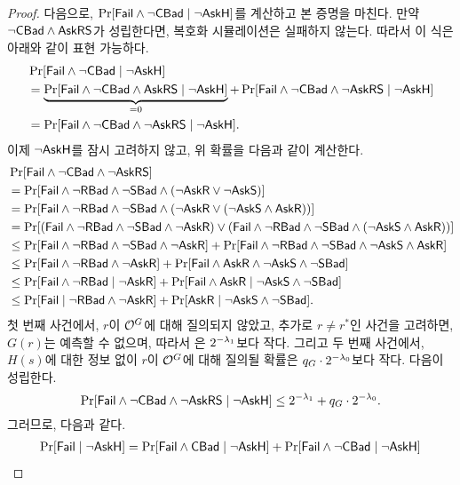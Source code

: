 \begin{proof}
	다음으로, $\Pr[\textsf{Fail} \land \neg\textsf{CBad} \mid \neg\textsf{AskH}]$를 계산하고 본 증명을
	마친다. 만약 $\neg \textsf{CBad} \wedge \textsf{AskRS}$가 성립한다면, 복호화
	시뮬레이션은 실패하지 않는다. 따라서 이 식은 아래와 같이 표현
	가능하다.
	\begin{align*}
		&\Pr[\textsf{Fail} \land \neg\textsf{CBad} \mid \neg \textsf{AskH}] \\
		&= \underbrace{\Pr[\textsf{Fail} \land \neg \textsf{CBad} \land \textsf{AskRS} \mid \neg \textsf{AskH}]}_{= 0}
		+ \Pr[\textsf{Fail} \land \neg \textsf{CBad} \land \neg \textsf{AskRS} \mid \neg \textsf{AskH}] \\
		&= \Pr[\textsf{Fail} \land \neg \textsf{CBad} \land \neg \textsf{AskRS} \mid \neg \textsf{AskH}].
	\end{align*}
	이제 $\neg \textsf{AskH}$를 잠시 고려하지 않고, 위 확률을 다음과 같이 계산한다.
	\begin{align*}
		&\Pr[\textsf{Fail} \land \neg\textsf{CBad} \land \neg\textsf{AskRS}] \\
		&= \Pr[\textsf{Fail} \land \neg\textsf{RBad} \land \neg\textsf{SBad} \land (\neg\textsf{AskR} \lor \neg\textsf{AskS})] \\
		&= \Pr[\textsf{Fail} \land \neg\textsf{RBad} \land \neg\textsf{SBad} \land (\neg\textsf{AskR} \lor (\neg\textsf{AskS} \land \textsf{AskR}))] \\
		&= \Pr[(\textsf{Fail} \land \neg\textsf{RBad} \land \neg\textsf{SBad} \land \neg\textsf{AskR}) \lor
		(\textsf{Fail} \land \neg\textsf{RBad} \land \neg\textsf{SBad} \land (\neg\textsf{AskS} \land \textsf{AskR}))] \\
		&\le \Pr[\textsf{Fail} \land \neg\textsf{RBad} \land \neg\textsf{SBad} \land \neg\textsf{AskR}]+
		\Pr[\textsf{Fail} \land \neg\textsf{RBad} \land \neg\textsf{SBad} \land \neg\textsf{AskS} \land \textsf{AskR}] \\
		&\le \Pr[\textsf{Fail} \land \neg\textsf{RBad} \land \neg\textsf{AskR}]+
		\Pr[\textsf{Fail} \land \textsf{AskR} \land \neg\textsf{AskS} \land \neg\textsf{SBad}] \\
		&\le \Pr[\textsf{Fail} \land \neg\textsf{RBad} \mid \neg\textsf{AskR}]+
		\Pr[\textsf{Fail} \land \textsf{AskR} \mid \neg\textsf{AskS} \land \neg\textsf{SBad}] \\
		&\le \Pr[\textsf{Fail} \mid \neg\textsf{RBad} \land \neg\textsf{AskR}] +
		\Pr[\textsf{AskR} \mid \neg\textsf{AskS} \land \neg\textsf{SBad}].
	\end{align*}
	첫 번째 사건에서, $r$이 $\mathcal{O}^{G}$에 대해 질의되지 않았고, 추가로 $r \ne
	r^*$인 사건을 고려하면, $G(r)$는 예측할 수 없으며, 따라서 은 $2^{-\lambda_1}$보다 작다. 그리고 두 번째
	사건에서, $H(s)$에 대한 정보 없이 $r$이 $\mathcal{O}^{G}$에 대해 질의될 확률은 $q_G \cdot
	2^{-\lambda_0}$보다 작다.  다음이
	성립한다.
	$$
		\Pr[\textsf{Fail} \wedge \neg \textsf{CBad} \wedge \neg \textsf{AskRS} \mid \neg \textsf{AskH}] 
		\leq 2^{-\lambda_1} + q_G \cdot 2^{-\lambda_0}.
	$$	
	그러므로, 다음과 같다.
	\begin{align*}
		\Pr[\Fail \mid \neg\askH]
		&= \Pr[\Fail \land \Cbad \mid \neg\askH] + \Pr[\Fail \land \neg\Cbad \mid \neg\askH] \\

\end{align*}
\end{proof}
